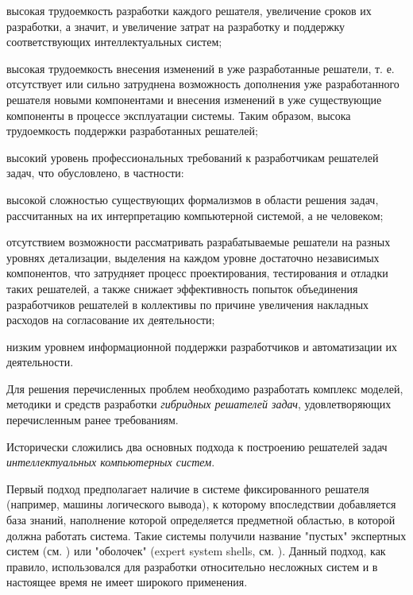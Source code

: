 \begin{textitemize}
\item высокая трудоемкость разработки каждого решателя, увеличение сроков их разработки, а значит, и увеличение затрат на разработку и поддержку соответствующих интеллектуальных систем;
\item высокая трудоемкость внесения изменений в уже разработанные решатели, т. е. отсутствует или сильно затруднена возможность дополнения уже разработанного решателя новыми компонентами и внесения изменений в уже существующие компоненты в процессе эксплуатации системы. Таким образом, высока трудоемкость поддержки разработанных решателей;
\item высокий уровень профессиональных требований к разработчикам решателей задач, что обусловлено, в частности:
	\begin{textitemize}
	\item высокой сложностью существующих формализмов в области решения задач, рассчитанных на их интерпретацию компьютерной системой, а не человеком;
	\item отсутствием возможности рассматривать разрабатываемые решатели на разных уровнях детализации, выделения на каждом уровне достаточно независимых компонентов, что затрудняет процесс проектирования, тестирования и отладки таких решателей, а также снижает эффективность попыток объединения разработчиков решателей в коллективы по причине увеличения накладных расходов на согласование их деятельности;
	\item низким уровнем информационной поддержки разработчиков и автоматизации их деятельности.
\end{textitemize}
\end{textitemize}

Для решения перечисленных проблем необходимо разработать комплекс моделей, методики и средств разработки \textit{гибридных решателей задач}, удовлетворяющих перечисленным ранее требованиям.

Исторически сложились два основных подхода к построению решателей задач \textit{интеллектуальных компьютерных систем}.

Первый подход предполагает наличие в системе фиксированного решателя (например, машины логического вывода), к которому впоследствии добавляется база знаний, наполнение которой определяется предметной областью, в которой должна работать система. Такие системы получили название "пустых"{} экспертных систем (см. ) или "оболочек"{} (expert system shells, см. ). Данный подход, как правило, использовался для разработки относительно несложных систем и в настоящее время не имеет широкого применения.

